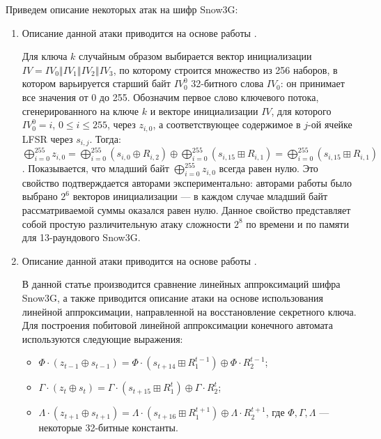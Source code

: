 \documentclass{./civarticle}
\begin{document}
Приведем описание некоторых атак на шифр Snow3G:
\begin{enumerate}
    \item
    Описание данной атаки приводится на основе работы \cite{atack1}.
    
    Для ключа $k$ случайным образом выбирается вектор инициализации $IV = IV_0 \mathbin\Vert IV_1 \mathbin\Vert IV_2 \mathbin\Vert IV_3$, по которому строится множество из 256 наборов, в котором варьируется старший байт $IV_0^0$ 32-битного слова $IV_0$: он принимает все значения от 0 до 255. Обозначим первое слово ключевого потока, сгенерированного на ключе $k$ и векторе инициализации $IV$, для которого $IV_0^0 = i$, $0 \leq i \leq 255$, через $z_{i, 0}$, а соответствующее содержимое в $j$-ой ячейке LFSR через $s_{i, j}$. Тогда: $\bigoplus_{i=0}^{255}{z_{i, 0}} = \bigoplus_{i=0}^{255}{(s_{i, 0} \oplus R_{i, 2})} \oplus \bigoplus_{i=0}^{255}{(s_{i, 15} \boxplus R_{i, 1})} = \bigoplus_{i=0}^{255}{(s_{i, 15} \boxplus R_{i, 1})}$. Показывается, что младший байт $\bigoplus_{i=0}^{255}{z_{i, 0}}$ всегда равен нулю. Это свойство подтверждается авторами экспериментально: авторами работы было выбрано $2^6$ векторов инициализации --- в каждом случае младший байт рассматриваемой суммы оказался равен нулю. Данное свойство представляет собой простую различительную атаку сложности $2^8$ по времени и по памяти для 13-раундового Snow3G.

    
    \item
    Описание данной атаки приводится на основе работы \cite{art4}.

    В данной статье производится сравнение линейных аппроксимаций шифра Snow3G, а также приводится описание атаки на основе использования линейной аппроксимации, направленной на восстановление секретного ключа. Для построения побитовой линейной аппроксимации конечного автомата используются следующие выражения: 

    \begin{itemize}
        \item $\Phi \cdot (z_{t-1} \oplus s_{t-1}) = \Phi \cdot (s_{t+14} \boxplus R_1^{t-1}) \oplus \Phi \cdot R_2^{t-1}$;
        \item $\Gamma \cdot (z_{t} \oplus s_{t}) = \Gamma \cdot (s_{t+15} \boxplus R_1^{t}) \oplus \Gamma \cdot R_2^{t}$;
        \item $\Lambda \cdot (z_{t+1} \oplus s_{t+1}) = \Lambda \cdot (s_{t+16} \boxplus R_1^{t+1}) \oplus \Lambda \cdot R_2^{t+1}$, где $\Phi, \Gamma, \Lambda$ --- некоторые 32-битные константы.
    \end{itemize}


\end{enumerate}
\end{document}
